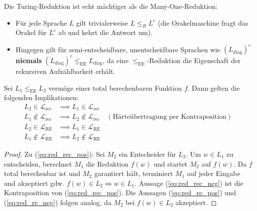 \begin{remark}
    Die Turing-Reduktion ist echt mächtiger als die Many-One-Reduktion:
    \begin{itemize}
        \item Für jede Sprache $L$ gilt trivialerweise $L \le_R L^c$ (die Orakelmaschine fragt das Orakel für $L^c$ ab und kehrt die Antwort um).
        \item Hingegen gilt für semi-entscheidbare, unentscheidbare Sprachen wie $(L_{\mathrm{diag}})^c$ \textbf{niemals} $(L_{\mathrm{diag}})^c \le_{\mathrm{EE}} L_{\mathrm{diag}}$, da eine $\le_{\mathrm{EE}}$-Reduktion die Eigenschaft der rekursiven Aufzählbarkeit erhält.
    \end{itemize}
\end{remark}

\begin{theorem}
    Sei $L_1 \le_{\mathrm{EE}} L_2$ vermöge einer total berechenbaren Funktion $f$. Dann gelten die folgenden Implikationen:
    \begin{align}
        L_2 \in \mathcal{L}_{\mathrm{rec}} &\implies L_1 \in \mathcal{L}_{\mathrm{rec}} \label{eq:red_rec_pos} \\
        L_1 \notin \mathcal{L}_{\mathrm{rec}} &\implies L_2 \notin \mathcal{L}_{\mathrm{rec}} \quad (\text{Härteübertragung per Kontraposition}) \label{eq:red_rec_neg} \\
        L_2 \in \mathcal{L}_{\mathrm{RE}} &\implies L_1 \in \mathcal{L}_{\mathrm{RE}} \label{eq:red_re_pos} \\
        L_1 \notin \mathcal{L}_{\mathrm{RE}} &\implies L_2 \notin \mathcal{L}_{\mathrm{RE}} \label{eq:red_re_neg}
    \end{align}
\end{theorem}

\begin{proof}
    Zu (\ref{eq:red_rec_pos}): Sei $M_2$ ein Entscheider für $L_2$. Um $w \in L_1$ zu entscheiden, berechnet $M_1$ die Reduktion $f(w)$ und startet $M_2$ auf $f(w)$. Da $f$ total berechenbar ist und $M_2$ garantiert hält, terminiert $M_1$ auf jeder Eingabe und akzeptiert gdw. $f(w) \in L_2 \iff w \in L_1$.
    Aussage (\ref{eq:red_rec_neg}) ist die Kontraposition von (\ref{eq:red_rec_pos}).
    Die Aussagen (\ref{eq:red_re_pos}) und (\ref{eq:red_re_neg}) folgen analog, da $M_2$ bei $f(w) \in L_2$ akzeptiert.
\end{proof}

